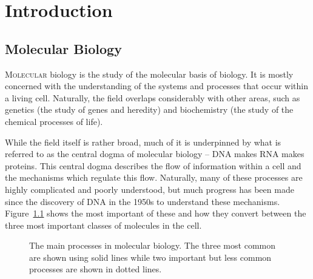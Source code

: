 
\chapter{Introduction}
\label{chap:Introduction} 

\section{Molecular Biology}
\label{sec:MolecularBiology}

\lettrine{M}{olecular} biology is the study of the molecular basis of biology.
It is mostly concerned with the understanding of the systems and processes
that occur within a living cell.
Naturally, the field overlaps considerably with other areas, 
such as genetics (the study of genes and heredity) and biochemistry (the study
of the chemical processes of life).

While the field itself is rather broad, much of it is underpinned by what is
referred to as the central dogma of molecular biology -- 
DNA makes RNA makes proteins.
This central dogma describes the flow of information within a cell and the
mechanisms which regulate this flow.
Naturally, many of these processes are highly complicated and poorly
understood, but much progress has been made since the discovery of DNA in the
1950s to understand these mechanisms.
Figure~\ref{fig:processes} shows the most important of these and how
they convert between the three most important classes of molecules in the cell.

\begin{figure}
  \centering
  \caption{The main processes in molecular biology. The three most common are
    shown using solid lines while two important but less common processes are
    shown in dotted lines.
    \label{fig:processes}}
\end{figure}

